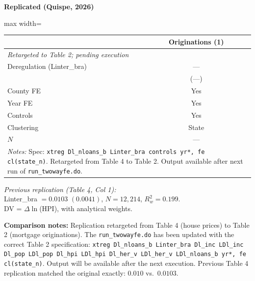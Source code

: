 \documentclass[11pt,a4paper]{article}
\begin{document}
\begin{minipage}[t]{0.48\textwidth}
\centering
\textbf{\large Replicated (Quispe, 2026)}
\vspace{0.3cm}

\begin{adjustbox}{max width=\textwidth}
\begin{tabular}{lc}
\toprule
 & Originations (1) \\
\midrule
\multicolumn{2}{l}{\textit{Retargeted to Table 2; pending execution}} \\[3pt]
Deregulation (Linter\_bra) & --- \\
 & (---) \\[0.3em]
\midrule
County FE & Yes \\
Year FE & Yes \\
Controls & Yes \\
Clustering & State \\
$N$ & --- \\
\bottomrule
\multicolumn{2}{p{0.95\textwidth}}{\footnotesize\textit{Notes:} Spec: \texttt{xtreg Dl\_nloans\_b Linter\_bra controls yr*, fe cl(state\_n)}. Retargeted from Table 4 to Table 2. Output available after next run of \texttt{run\_twowayfe.do}.}
\end{tabular}
\end{adjustbox}

\vspace{0.5cm}
{\small\textit{Previous replication (Table 4, Col 1):}\\
Linter\_bra $= 0.0103$ $(0.0041)$, $N = 12{,}214$, $R^2_w = 0.199$.\\
DV = $\Delta\ln$(HPI), with analytical weights.}
\end{minipage}

\vspace{1cm}
\textbf{Comparison notes:} Replication retargeted from Table 4 (house prices) to Table 2 (mortgage originations). The \texttt{run\_twowayfe.do} has been updated with the correct Table 2 specification: \texttt{xtreg Dl\_nloans\_b Linter\_bra Dl\_inc LDl\_inc Dl\_pop LDl\_pop Dl\_hpi LDl\_hpi Dl\_her\_v LDl\_her\_v LDl\_nloans\_b yr*, fe cl(state\_n)}. Output will be available after the next execution. Previous Table 4 replication matched the original exactly: $0.010$ vs.\ $0.0103$.

\newpage

\end{document}
